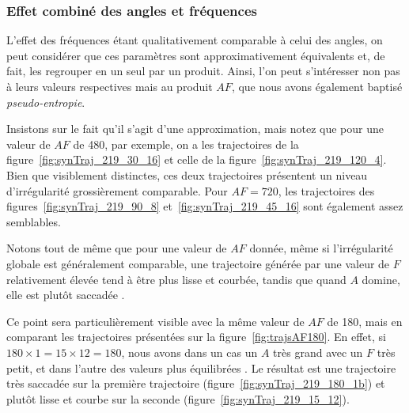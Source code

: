 	\FloatBarrier \subsubsection{Effet combiné des angles et fréquences}
	L'effet des fréquences étant qualitativement comparable à celui des angles, on peut considérer que ces paramètres sont approximativement équivalents et, de fait, les regrouper en un seul par un produit. Ainsi, l'on peut s'intéresser non pas à leurs valeurs respectives mais au produit $AF$, que nous avons également baptisé \emph{pseudo-entropie}.
	
	Insistons sur le fait qu'il s'agit d'une approximation, mais notez que pour une valeur de $AF$ de 480, par exemple, on a les trajectoires de la figure~\ref{fig:synTraj_219_30_16} et celle de la figure~\ref{fig:synTraj_219_120_4}. Bien que visiblement distinctes, ces deux trajectoires présentent un niveau d'irrégularité grossièrement comparable. Pour $AF = 720$, les trajectoires des figures~\ref{fig:synTraj_219_90_8} et~\ref{fig:synTraj_219_45_16} sont également assez semblables.
	
	Notons tout de même que pour une valeur de $AF$ donnée, même si l'irrégularité globale est généralement comparable, une trajectoire générée par une valeur de $F$ relativement élevée tend à être plus lisse et courbée, tandis que quand $A$ domine, elle est plutôt \og saccadée \fg{}.
	
	Ce point sera particulièrement visible avec la même valeur de $AF$ de 180, mais en comparant les trajectoires présentées sur la figure~\ref{fig:trajsAF180}. En effet, si $180 \times 1 = 15 \times 12 = 180$, nous avons dans un cas un $A$ très grand avec un $F$ très petit, et dans l'autre des valeurs plus \og équilibrées \fg{}. Le résultat est une trajectoire très saccadée sur la première trajectoire (figure~\ref{fig:synTraj_219_180_1b}) et plutôt lisse et courbe sur la seconde (figure~\ref{fig:synTraj_219_15_12}).
	
